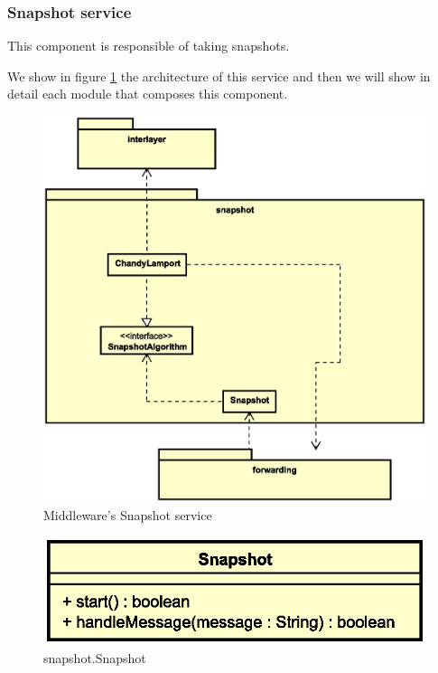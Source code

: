 \subsubsection{Snapshot service}
This component is responsible of taking snapshots.

We show in figure \ref{fig:mw-snapshot} the architecture of this service and
then we will show in detail each module that composes this component.

\begin{figure}[H]
  \centering
  \includegraphics[width=\columnwidth]{images/solution/mw/snapshot.eps}
  \caption{Middleware's Snapshot service}
  \label{fig:mw-snapshot}
\end{figure}


\begin{figure}[H]
  \centering
  \includegraphics[width=.5\columnwidth]{images/solution/mw/sn/snap.eps}
  \caption{snapshot.Snapshot}
  \label{fig:mw-snapshot-snapshot}
\end{figure}

